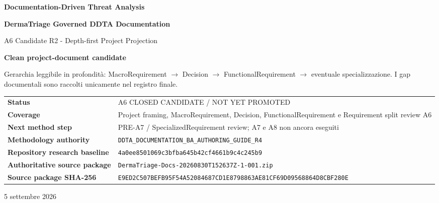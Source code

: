 \documentclass[11pt,a4paper]{article}
\begin{document}

\begin{titlepage}
\thispagestyle{empty}
\vspace*{9mm}
{\sffamily\bfseries\color{DDTANavy}\fontsize{15}{18}\selectfont Documentation-Driven Threat Analysis}\par
\vspace{5mm}
{\sffamily\bfseries\color{DDTANavy}\fontsize{28}{32}\selectfont DermaTriage Governed DDTA Documentation}\par
\vspace{2mm}
{\sffamily\color{DDTABlue}\fontsize{18}{22}\selectfont A6 Candidate R2 - Depth-first Project Projection}\par

\vspace{10mm}
\begin{tcolorbox}[enhanced,arc=3pt,boxrule=0pt,colback=DDTANavy,left=12pt,right=12pt,top=10pt,bottom=10pt]
{\color{white}\sffamily\bfseries Clean project-document candidate}\par
\vspace{2mm}
{\color{white!88}\small Gerarchia leggibile in profondità: MacroRequirement $\rightarrow$ Decision $\rightarrow$ FunctionalRequirement $\rightarrow$ eventuale specializzazione. I gap documentali sono raccolti unicamente nel registro finale.}
\end{tcolorbox}

\vspace{8mm}
\begin{tabularx}{\textwidth}{L{46mm}Y}
\toprule
\textbf{Status} & A6 CLOSED CANDIDATE / NOT YET PROMOTED \\
\textbf{Coverage} & Project framing, MacroRequirement, Decision, FunctionalRequirement e Requirement split review A6 \\
\textbf{Next method step} & PRE-A7 / SpecializedRequirement review; A7 e A8 non ancora eseguiti \\
\textbf{Methodology authority} & \texttt{DDTA\_DOCUMENTATION\_BA\_AUTHORING\_GUIDE\_R4} \\
\textbf{Repository research baseline} & \texttt{4a0ee8501069c3bfba645b42cf4661b9c4c245b9} \\
\textbf{Authoritative source package} & \texttt{DermaTriage-Docs-20260830T152637Z-1-001.zip} \\
\textbf{Source package SHA-256} & {\scriptsize\nolinkurl{E9ED2C507BEFB95F54A52084687CD1E8798863AE81CF69D09568864D8CBF280E}} \\
\bottomrule
\end{tabularx}

\vfill
{\sffamily\small\color{DDTAGray}5 settembre 2026}
\end{titlepage}
\end{document}
